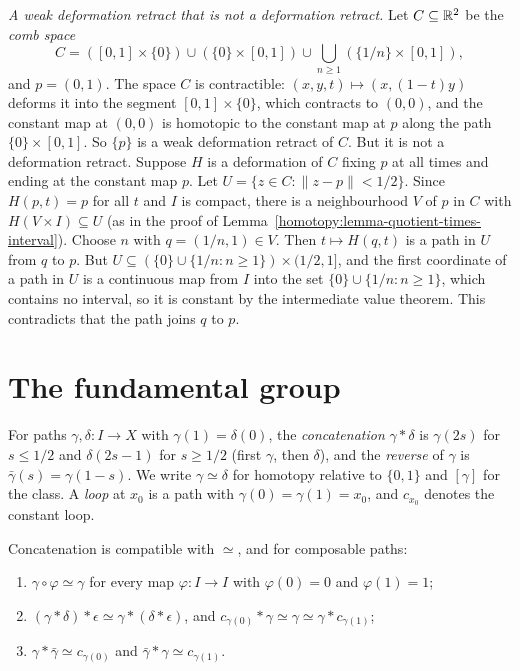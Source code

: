 \begin{counterexample}\label{homotopy:counterexample-comb}
\emph{A weak deformation retract that is not a deformation retract.} Let $C \subseteq \mathbb{R}^2$ be the \emph{comb space}
\[
C = ([0, 1] \times \{0\}) \cup (\{0\} \times [0, 1]) \cup \textstyle\bigcup_{n \geq 1}(\{1/n\} \times [0, 1]),
\]
and $p = (0, 1)$. The space $C$ is contractible: $(x, y, t) \mapsto (x, (1 - t)y)$ deforms it into the segment $[0, 1] \times \{0\}$, which contracts to $(0, 0)$,
and the constant map at $(0, 0)$ is homotopic to the constant map at $p$ along the path $\{0\} \times [0, 1]$. So $\{p\}$ is a weak deformation retract of $C$. But
it is not a deformation retract. Suppose $H$ is a deformation of $C$ fixing $p$ at all times and ending at the constant map $p$. Let
$U = \{z \in C : \|z - p\| < 1/2\}$. Since $H(p, t) = p$ for all $t$ and $I$ is compact, there is a neighbourhood $V$ of $p$ in $C$ with $H(V \times I) \subseteq U$
(as in the proof of Lemma~\ref{homotopy:lemma-quotient-times-interval}). Choose $n$ with $q = (1/n, 1) \in V$. Then $t \mapsto H(q, t)$ is a path in $U$ from
$q$ to $p$. But $U \subseteq (\{0\} \cup \{1/n : n \geq 1\}) \times (1/2, 1]$, and the first coordinate of a path in $U$ is a continuous map from $I$ into the set
$\{0\} \cup \{1/n : n \geq 1\}$, which contains no interval, so it is constant by the intermediate value theorem. This contradicts that the path joins $q$ to $p$.
\end{counterexample}

\section{The fundamental group}\label{homotopy:section-fundamental-group}

\begin{definition}\label{homotopy:definition-paths}
For paths $\gamma, \delta \colon I \to X$ with $\gamma(1) = \delta(0)$, the \emph{concatenation} $\gamma * \delta$ is $\gamma(2s)$ for $s \leq 1/2$ and
$\delta(2s - 1)$ for $s \geq 1/2$ (first $\gamma$, then $\delta$), and the \emph{reverse} of $\gamma$ is $\bar{\gamma}(s) = \gamma(1 - s)$. We write
$\gamma \simeq \delta$ for homotopy relative to $\{0, 1\}$ and $[\gamma]$ for the class. A \emph{loop} at $x_0$ is a path with $\gamma(0) = \gamma(1) = x_0$,
and $c_{x_0}$ denotes the constant loop.
\end{definition}

\begin{lemma}\label{homotopy:lemma-groupoid}
Concatenation is compatible with $\simeq$, and for composable paths:
\begin{enumerate}
\item $\gamma \circ \varphi \simeq \gamma$ for every map $\varphi \colon I \to I$ with $\varphi(0) = 0$ and $\varphi(1) = 1$;
\item $(\gamma * \delta) * \epsilon \simeq \gamma * (\delta * \epsilon)$, and $c_{\gamma(0)} * \gamma \simeq \gamma \simeq \gamma * c_{\gamma(1)}$;
\item $\gamma * \bar{\gamma} \simeq c_{\gamma(0)}$ and $\bar\gamma * \gamma \simeq c_{\gamma(1)}$.
\end{enumerate}
\end{lemma}

